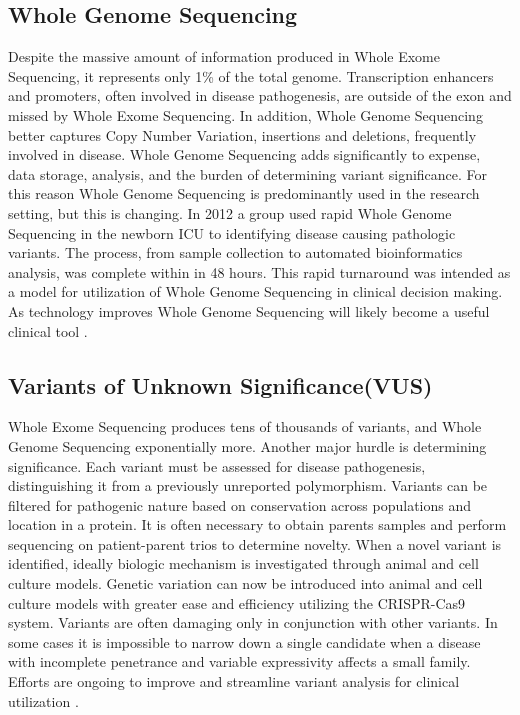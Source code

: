 \documentclass[sigconf]{acmart}
\begin{document}
\subsection{Whole Genome Sequencing}
Despite the massive amount of information produced in Whole Exome Sequencing, it represents only 1\% of the total genome.  Transcription enhancers and promoters, often involved in disease pathogenesis, are outside of the exon and missed by Whole Exome Sequencing.   In addition, Whole Genome Sequencing better captures Copy Number Variation, insertions and deletions, frequently involved in disease. Whole Genome Sequencing adds significantly to expense, data storage, analysis, and the burden of determining variant significance.  For this reason Whole Genome Sequencing is predominantly used in the research setting, but this is changing.  In 2012 a group used rapid Whole Genome Sequencing in the newborn ICU to identifying disease causing pathologic variants.  The process, from sample collection to automated bioinformatics analysis, was complete within in 48 hours.  This rapid turnaround was intended as a model for utilization of Whole Genome Sequencing in clinical decision making.  As technology improves Whole Genome Sequencing will likely become a useful clinical tool \cite{ng2010whole}.

\subsection{Variants of Unknown Significance(VUS)}
Whole Exome Sequencing produces tens of thousands of variants, and Whole Genome Sequencing exponentially more.  Another major hurdle is determining significance.  Each variant must be assessed for disease pathogenesis, distinguishing it from a previously unreported polymorphism. Variants can be filtered for pathogenic nature based on conservation across populations and location in a protein. It is often necessary to obtain parents samples and perform sequencing on patient-parent trios to determine novelty. When a novel variant is identified, ideally biologic mechanism is investigated through animal and cell culture models. Genetic variation can now be introduced into animal and cell culture models with greater ease and efficiency utilizing the CRISPR-Cas9 system. Variants are often damaging only in conjunction with other variants.  In some cases it is impossible to narrow down a single candidate when a disease with incomplete penetrance and variable expressivity affects a small family.  Efforts are ongoing to improve and streamline variant analysis for clinical utilization \cite{niemitz2007variants}.
\end{document}
